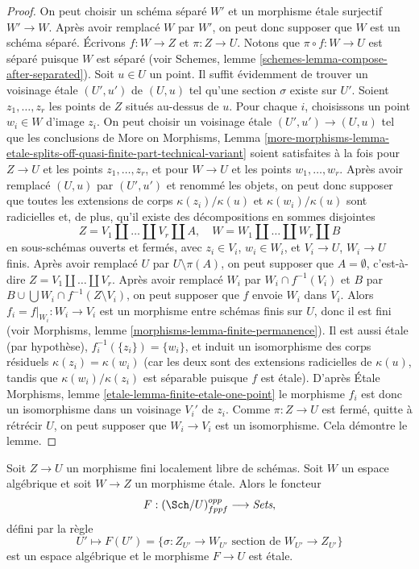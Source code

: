\begin{proof}
On peut choisir un schéma séparé $W'$ et un morphisme étale surjectif
$W' \to W$. Après avoir remplacé $W$ par $W'$, on peut donc supposer que $W$
est un schéma séparé. Écrivons $f : W \to Z$ et $\pi : Z \to U$.
Notons que $\pi \circ f : W \to U$ est séparé puisque
$W$ est séparé (voir
Schemes, lemme \ref{schemes-lemma-compose-after-separated}).
Soit $u \in U$ un point. Il suffit évidemment
de trouver un voisinage étale $(U', u')$ de $(U, u)$ tel qu'une
section $\sigma$ existe sur $U'$. Soient $z_1, \ldots, z_r$
les points de $Z$ situés au-dessus de $u$. Pour chaque $i$, choisissons un point
$w_i \in W$ d'image $z_i$. On peut choisir un voisinage étale
$(U', u') \to (U, u)$ tel que les conclusions de
More on Morphisms, Lemma
\ref{more-morphisms-lemma-etale-splits-off-quasi-finite-part-technical-variant}
soient satisfaites à la fois pour $Z \to U$ et les points $z_1, \ldots, z_r$,
et pour $W \to U$ et les points $w_1, \ldots, w_r$. Après avoir
remplacé $(U, u)$ par $(U', u')$ et renommé les objets, on peut donc supposer que
toutes les extensions de corps $\kappa(z_i)/\kappa(u)$ et
$\kappa(w_i)/\kappa(u)$ sont radicielles et, de plus,
qu'il existe des décompositions en sommes disjointes
$$
Z = V_1 \amalg \ldots \amalg V_r \amalg A, \quad
W = W_1 \amalg \ldots \amalg W_r \amalg B
$$
en sous-schémas ouverts et fermés,
avec $z_i \in V_i$, $w_i \in W_i$, et $V_i \to U$, $W_i \to U$ finis.
Après avoir remplacé $U$ par $U \setminus \pi(A)$, on peut supposer que
$A = \emptyset$, c'est-à-dire $Z = V_1 \amalg \ldots \amalg V_r$.
Après avoir remplacé $W_i$ par $W_i \cap f^{-1}(V_i)$ et
$B$ par $B \cup \bigcup W_i \cap f^{-1}(Z \setminus V_i)$,
on peut supposer que $f$ envoie $W_i$ dans $V_i$.
Alors $f_i = f|_{W_i} : W_i \to V_i$ est un morphisme entre schémas finis sur $U$,
donc il est fini (voir
Morphisms, lemme \ref{morphisms-lemma-finite-permanence}).
Il est aussi étale (par hypothèse),
$f_i^{-1}(\{z_i\}) = \{w_i\}$, et induit un isomorphisme des corps
résiduels $\kappa(z_i) = \kappa(w_i)$ (car les deux sont des extensions radicielles
de $\kappa(u)$, tandis que $\kappa(w_i)/\kappa(z_i)$
est séparable puisque $f$ est étale). D'après
\'Etale Morphisms, lemme \ref{etale-lemma-finite-etale-one-point}
le morphisme $f_i$ est donc un isomorphisme dans un voisinage $V_i'$ de
$z_i$. Comme $\pi : Z \to U$ est fermé, quitte à rétrécir $U$, on peut supposer
que $W_i \to V_i$ est un isomorphisme. Cela démontre le lemme.
\end{proof}

\begin{lemma}
\label{lemma-space-of-sections}
Soit $Z \to U$ un morphisme fini localement libre de schémas.
Soit $W$ un espace algébrique et soit $W \to Z$ un morphisme étale.
Alors le foncteur
$$
F : (\Sch/U)_{fppf}^{opp} \longrightarrow \textit{Sets},
$$
défini par la règle
$$
U' \longmapsto
F(U') =
\{\sigma : Z_{U'} \to W_{U'}\text{ section de }W_{U'} \to Z_{U'}\}
$$
est un espace algébrique et le morphisme $F \to U$ est étale.
\end{lemma}

